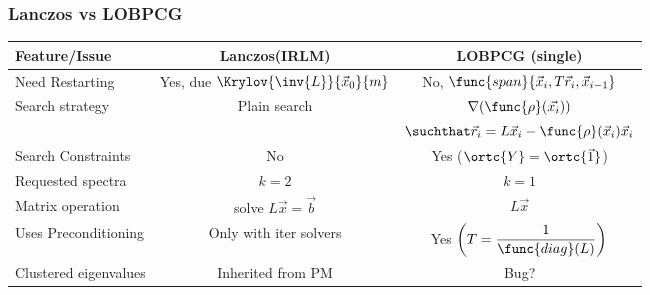 \begin{frame}
  \frametitle{Lanczos vs LOBPCG}
  \begin{table}
    \begin{tabular}{l | c | c | }
      Feature/Issue & Lanczos(IRLM) & LOBPCG (single) \\
      \hline \hline
      Need Restarting &
      Yes, due $\Krylov{\inv{L}}{\vec{x}_0}{m}$ &
      No, $\func{span} \{\vec{x}_i, T\vec{r}_i, \vec{x}_{i-1}\}$ \\
      \hline
      Search strategy &
      Plain search &
      $\nabla (\func{\rho}(\vec{x_i}))$ \\
       &
       &
      $\suchthat \vec{r}_i = L\vec{x}_i - \func{\rho}(\vec{x}_i)\vec{x}_i$\\
      \hline
      Search Constraints &
      No &
      Yes ($\ortc{Y} = \ortc{\vec{1}}$) \\
      \hline
      Requested spectra &
      $k=2$ &
      $k=1$ \\      
      \hline
      Matrix operation &
      solve $L\vec{x} = \vec{b}$ &
      $L\vec{x}$ \\
      \hline      
      Uses Preconditioning &
      Only with iter solvers &
      Yes $\left(T = \dfrac{1}{\func{diag}(L)} \right)$ \\
      \hline
      Clustered eigenvalues &
      Inherited from PM &
      Bug? \\      
      \hline
    \end{tabular}
  \end{table}
\end{frame}
